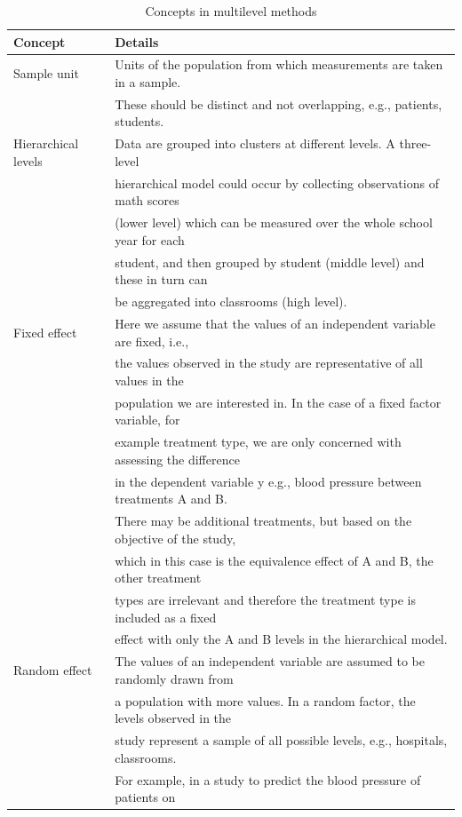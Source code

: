 \documentclass[
]{jss}
\begin{document}
\begin{table}[tb]
\caption{Concepts in multilevel methods}
\label{tab:clus}
\centering
\begin{tabular}{ll}
\hline
\textbf{Concept} & \textbf{Details}   \\
\hline
Sample unit         & Units of the population from which measurements are taken in a sample.\\                           & These should be distinct and not overlapping, e.g., patients, students.\\ 
Hierarchical levels & Data are grouped into clusters at different levels. A three-level \\                               & hierarchical model could occur by collecting observations of math scores\\                         & (lower level) which can be measured over the whole school year for each\\                          & student, and then grouped by student (middle level) and these in turn can\\                        & be aggregated into classrooms (high level).\\
Fixed effect        & Here we assume that the values of an independent variable are fixed, i.e., \\ 
  & the values observed in the study are representative of all values in the \\                        & population we are interested in. In the case of a fixed factor variable, for \\                     & example treatment type, we are only concerned with assessing the difference \\ 
                & in the dependent variable y e.g., blood pressure between treatments A and B.\\                     & There may be additional treatments, but based on the objective of the study,\\                     & which in this case is the equivalence effect of A and B, the other treatment\\                     & types are irrelevant and therefore the treatment type is included as a fixed \\                     & effect with only the A and B levels in the hierarchical model. \\
Random effect       & The values of an independent variable are assumed to be randomly drawn from \\                     & a population with more values. In a random factor, the levels observed in the\\                     & study represent a sample of all possible levels, e.g., hospitals, classrooms.\\                     & For example, in a study to predict the blood pressure of patients on \\  

\end{tabular}
\end{table}
\end{document}
